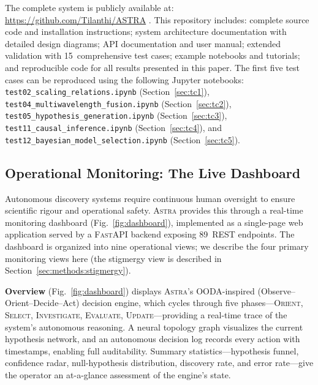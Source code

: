 \documentclass[usenatbib]{rasti}
\newcommand{\astra}{\textsc{Astra}\xspace}
\begin{document}
The complete system is publicly available at: \url{https://github.com/Tilanthi/ASTRA} \citep{White2026}.
This repository includes: complete source code and installation instructions; system architecture documentation with detailed design diagrams; API documentation and user manual; extended validation with 15~comprehensive test cases; example notebooks and tutorials; and reproducible code for all results presented in this paper.
The first five test cases can be reproduced using the following Jupyter notebooks:
\texttt{test02\_scaling\_relations.ipynb} (Section~\ref{sec:tc1}),
\texttt{test04\_multiwavelength\_fusion.ipynb} (Section~\ref{sec:tc2}),
\texttt{test05\_hypothesis\_generation.ipynb} (Section~\ref{sec:tc3}),
\texttt{test11\_causal\_inference.ipynb} (Section~\ref{sec:tc4}), and
\texttt{test12\_bayesian\_model\_selection.ipynb} (Section~\ref{sec:tc5}).

\subsection{Operational Monitoring: The Live Dashboard}
\label{sec:methods:dashboard}

Autonomous discovery systems require continuous human oversight to ensure scientific rigour and operational safety.
\astra provides this through a real-time monitoring dashboard (Fig.~\ref{fig:dashboard}), implemented as a single-page web application served by a \textsc{FastAPI} backend exposing 89~REST endpoints.
The dashboard is organized into nine operational views; we describe the four primary monitoring views here (the stigmergy view is described in Section~\ref{sec:methods:stigmergy}).

\textbf{Overview} (Fig.~\ref{fig:dashboard}) displays \astra's OODA-inspired (Observe--Orient--Decide--Act) decision engine, which cycles through five phases---\textsc{Orient}, \textsc{Select}, \textsc{Investigate}, \textsc{Evaluate}, \textsc{Update}---providing a real-time trace of the system's autonomous reasoning.
A neural topology graph visualizes the current hypothesis network, and an autonomous decision log records every action with timestamps, enabling full auditability.
Summary statistics---hypothesis funnel, confidence radar, null-hypothesis distribution, discovery rate, and error rate---give the operator an at-a-glance assessment of the engine's state.
\end{document}
